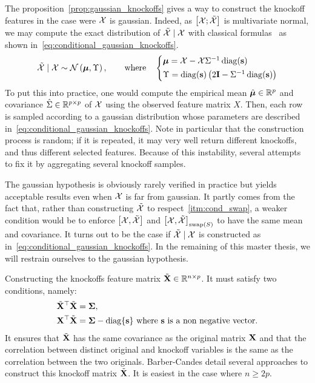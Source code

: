 The proposition~\ref{prop:gaussian_knockoffs} gives a way to construct the knockoff features in the case were
$\mathcal{X}$ is gaussian.
Indeed, as $\big[ \mathcal{X}; \tilde{\mathcal{X}} \big]$ is multivariate normal, we may compute the exact distribution of
$\tilde{\mathcal{X}} \mid \mathcal{X}$ with classical formulas~\cite{conditional_normal} as shown in~\ref{eq:conditional_gaussian_knockoffs}.
\begin{equation}\label{eq:conditional_gaussian_knockoffs}
        \tcX \mid \cX \sim \cN\left( \bmu, \Upsilon \right)
        ,\qquad\text{where}\quad
        \begin{cases*}
                \bmu = \cX - \cX\Sigma^{-1}\diag(\bs)\\
                \Upsilon = \diag(\bs)\left( 2\mI - \Sigma^{-1}\diag(\bs) \right)
        \end{cases*}
\end{equation}
To put this into practice, one would compute the empirical mean
$\hat{\bm{\mu}} \in \mathbb{R}^p$ and covariance $\hat{\Sigma} \in \mathbb{R}^{p \times p}$ of $\mathcal{X}$
using the observed feature matrix $X$.
Then, each row is sampled according to a gaussian distribution whose parameters are described
in~\ref{eq:conditional_gaussian_knockoffs}.
Note in particular that the construction process is random;
if it is repeated, it may very well return different knockoffs, and thus different
selected features.
Because of this instability, several attempts~\cite{improve_stability_knockoffs} to fix it by
aggregating several knockoff samples.

The gaussian hypothesis is obviously rarely verified in practice but yields acceptable results even when
$\mathcal{X}$ is far from gaussian.
It partly comes from the fact that, rather than constructing $\tilde{\mathcal{X}}$ to respect~\ref{itm:cond_swap},
a weaker condition would be to enforce $\big[ \mathcal{X}, \tilde{\mathcal{X}} \big]$ and $\big[ \mathcal{X}, \tilde{\mathcal{X}} \big]_{\operatorname{swap}(S)}$ to have the
same mean and covariance.
It turns out to be the case if $\tilde{\mathcal{X}} \mid \mathcal{X}$ is constructed as in~\ref{eq:conditional_gaussian_knockoffs}.
In the remaining of this master thesis, we will restrain ourselves to the gaussian hypothesis.

Constructing the knockoffs feature matrix $\tilde{\mathbf{X}} \in \mathbb{R}^{n \times p}$.
It must satisfy two conditions, namely:
\begin{align*}
        &{\tilde{\mathbf{X}}}^\top\tilde{\mathbf{X}} = \bm{\Sigma},
        \\
        &\mathbf{X}^\top\tilde{\mathbf{X}} = \bm{\Sigma} - \operatorname*{diag}\{\mathbf{s}\}
        \text{ where } \mathbf{s} \text{ is a non negative vector.}
\end{align*}
It ensures that $\tilde{\mathbf{X}}$ has the same covariance as the original matrix $\mathbf{X}$
and that the correlation between distinct original and knockoff variables is the same as the correlation between the
two originals.
Barber-Candes detail several approaches to construct this knockoff matrix $\tilde{\mathbf{X}}$.
It is easiest in the case where $n \geq 2p$.

